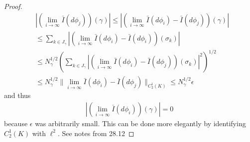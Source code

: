 \documentclass[12pt,a4paper]{article}
\numberwithin{equation}{subsection}
\numberwithin{lemma}{subsection}
\theoremstyle{definition}
\newcommand{\aop}{\mathscr{A}}
\newcommand{\rop}{\mathscr{R}} %
\begin{document}
\begin{proof}
    \begin{align*}
        &\left| \left( \lim\limits_{i \rightarrow \infty} \bar{I}(d\phi_j) 
        \right) (\gamma) \right| 
        \leq \left| \left( \lim\limits_{i \rightarrow \infty} \bar{I}(d\phi_i) 
        - \bar{I}(d\phi_j) 
        \right) (\gamma) \right| \\
        &\leq \sum\limits_{k \in J_\gamma} 
        \left| \left( 
            \lim\limits_{i \rightarrow \infty} \bar{I}(d\phi_i) 
            - \bar{I}(d\phi_i) 
        \right) (\sigma_k) \right| \\
        &\leq N^{1/2}_\gamma \left(
            \sum\limits_{k \in J_\gamma} 
            \left| \left( 
                    \lim\limits_{i \rightarrow \infty} \bar{I}(d\phi_i) 
                    - \bar{I}(d\phi_j) 
                \right) (\sigma_k) 
            \right|^2
        \right)^{1/2} \\
        &\leq N^{1/2}_\gamma \lVert  
            \lim\limits_{i \rightarrow \infty} \bar{I}(d\phi_i)
            - \bar{I}(d\phi_j)
        \rVert _{C^{1}_2(K)} 
        \leq N^{1/2}_\gamma \epsilon
    \end{align*}
    and thus 
    \begin{align*}
        \left| \left( \lim\limits_{i \rightarrow \infty} \bar{I}(d\phi_i) 
        \right) (\gamma) \right| = 0
    \end{align*}
    because $\epsilon$ was arbitrarily small. {\color{red} This can be done 
    more elegantly by identifying $C^1_2(K)$ with $\ell^2$. 
    See notes from 28.12}
\end{proof}
\end{document}
